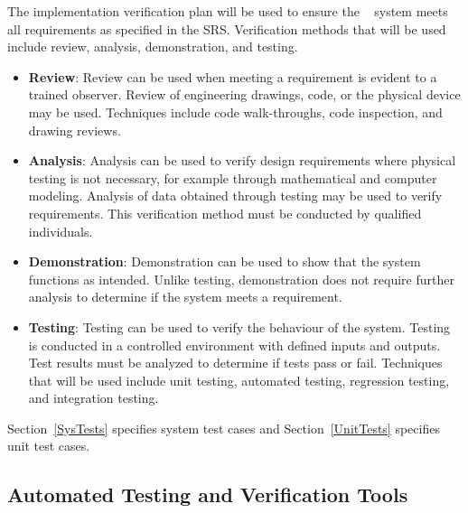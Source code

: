 \documentclass[12pt, titlepage]{article}
\begin{document}
  The implementation verification plan will be used to ensure the \progname~ system meets all requirements as specified in the SRS. Verification methods that will be used include review, analysis, demonstration, and testing. 
\begin{itemize}
  \item \textbf{Review}: Review can be used when meeting a requirement is evident to a trained observer. Review of engineering drawings, code, or the physical device may be used. Techniques include code walk-throughs, code inspection, and drawing reviews.
  \item \textbf{Analysis}: Analysis can be used to verify design requirements where physical testing is not necessary, for example through mathematical and computer modeling. Analysis of data obtained through testing may be used to verify requirements. This verification method must be conducted by qualified individuals.
  \item \textbf{Demonstration}: Demonstration can be used to show that the system functions as intended. Unlike testing, demonstration does not require further analysis to determine if the system meets a requirement.
  \item \textbf{Testing}: Testing can be used to verify the behaviour of the system. Testing is conducted in a controlled environment with defined inputs and outputs. Test results must be analyzed to determine if tests pass or fail. Techniques that will be used include unit testing, automated testing, regression testing, and integration testing.
\end{itemize}

\noindent Section~\ref{SysTests} specifies system test cases and Section~\ref{UnitTests} specifies unit test cases.

\subsection{Automated Testing and Verification Tools}

\end{document}
